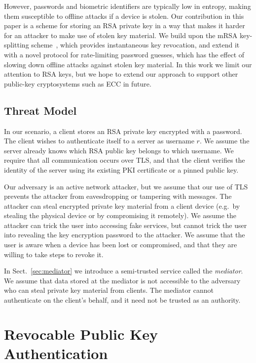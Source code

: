\documentclass{llncs}
\begin{document}
However, passwords and biometric identifiers are typically low in entropy, making them susceptible
to offline attacks if a device is stolen. Our contribution in this paper is a scheme for storing an
RSA private key in a way that makes it harder for an attacker to make use of stolen key material. We
build upon the mRSA key-splitting scheme~\cite{Boneh01,Kutyiowski12}, which provides instantaneous
key revocation, and extend it with a novel protocol for rate-limiting password guesses, which has
the effect of slowing down offline attacks against stolen key material. In this work
we limit our attention to RSA keys, but we hope to extend our approach to support other public-key
cryptosystems such as ECC in future.

\subsection{Threat Model}\label{sec:threatmodel}

In our scenario, a client stores an RSA private key encrypted with a password. The client wishes to
authenticate itself to a server as username $r$. We assume the server already knows which RSA public
key belongs to which username. We require that all communication occurs over TLS, and that the
client verifies the identity of the server using its existing PKI certificate or a pinned public
key.

Our adversary is an active network attacker, but we assume that our use of TLS prevents the attacker
from eavesdropping or tampering with messages. The attacker can steal encrypted private key material
from a client device (e.g.\ by stealing the physical device or by compromising it remotely). We
assume the attacker can trick the user into accessing fake services, but cannot trick the user into
revealing the key encryption password to the attacker. We assume that the user is aware when a
device has been lost or compromised, and that they are willing to take steps to revoke it.

In Sect.~\ref{sec:mediator} we introduce a semi-trusted service called the \emph{mediator}. We
assume that data stored at the mediator is not accessible to the adversary who can steal private key
material from clients. The mediator cannot authenticate on the client's behalf, and it need not be
trusted as an authority.

\section{Revocable Public Key Authentication}\label{sec:revocation}
\end{document}
